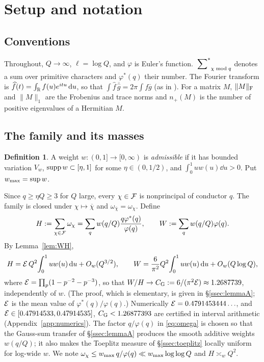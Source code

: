 \documentclass[11pt]{amsart}
\theoremstyle{definition}
\newtheorem{definition}[theorem]{Definition}
\theoremstyle{remark}
\numberwithin{equation}{section}
\begin{document}
\section{Setup and notation}\label{sec:setup}

\subsection{Conventions}
Throughout, $Q\to\infty$, $\ell=\log Q$, and $\varphi$ is Euler's function. $\sideset{}{^{*}}\sum_{\chi\bmod q}$ denotes a sum over primitive characters and $\varphi^*(q)$ their number. The Fourier transform is $\widehat f(t)=\int_\mathbb R f(u)e^{itu}\,\mathrm d u$, so that $\int\widehat f\,\overline{\widehat g}=2\pi\int f\overline g$ (as in \cite[(2.11)]{HY26}). For a matrix $M$, $\|M\|_\mathrm F$ and $\|M\|_1$ are the Frobenius and trace norms and $n_+(M)$ is the number of positive eigenvalues of a Hermitian $M$.

\subsection{The family and its masses}\label{sec:weights}
\begin{definition}\label{def:admissible}
A weight $w:(0,1]\to[0,\infty)$ is \emph{admissible} if it has bounded variation $V_w$, $\operatorname{supp} w\subset[\eta,1]$ for some $\eta\in(0,1/2)$, and $\int_0^1uw(u)\dd u>0$. Put $w_{\max}=\sup w$.
\end{definition}
Since $q\ge\eta Q\ge3$ for $Q$ large, every $\chi\in\mathcal F$ is nonprincipal of conductor $q$. The family is closed under $\chi\mapsto\overline\chi$ and $\omega_{\overline\chi}=\omega_\chi$. Define
\begin{equation}\label{eq:HW}
H:=\sum_{\chi\in\mathcal F}\omega_\chi=\sum_q w(q/Q)\frac{q\varphi^*(q)}{\varphi(q)},\qquad W:=\sum_qw(q/Q)\varphi(q).
\end{equation}
By Lemma~\ref{lem:WH},
\begin{equation}\label{eq:masses}
H=\mathcal E\,Q^2\!\int_0^1uw(u)\,\mathrm d u+O_w(Q^{3/2}),\qquad W=\frac6{\pi^2}Q^2\!\int_0^1uw(u)\,\mathrm d u+O_w(Q\log Q),
\end{equation}
where $\mathcal E=\prod_p(1-p^{-2}-p^{-3})$,
so that $W/H\to C_{\mathrm G}:=6/(\pi^2\mathcal E)\approx1.2687739$, independently of $w$. (The proof, which is elementary, is given in \S\ref{ssec:lemmaA}; $\mathcal E$ is the mean value of $\varphi^*(q)/\varphi(q)$.)
Numerically $\mathcal E=0.4791453444\ldots$, and $\mathcal E\in[0.47914533,0.47914535]$, $C_{\mathrm G}<1.26877393$ are certified in interval arithmetic (Appendix~\ref{app:numerics}). The factor $q/\varphi(q)$ in \eqref{eq:omega} is chosen so that the Gauss-sum transfer of \S\ref{ssec:lemmaA} produces the smooth additive weights $w(q/Q)$; it also makes the Toeplitz measure of \S\ref{ssec:toeplitz} locally uniform for log-wide $w$. We note $\omega_\chi\le w_{\max}\,q/\varphi(q)\ll w_{\max}\log\log Q$ and $H\asymp_wQ^2$.
\end{document}
